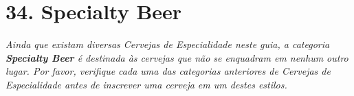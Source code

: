 \section*{34. Specialty Beer}
\textit{Ainda que existam diversas Cervejas de Especialidade neste guia, a categoria \textbf{Specialty Beer} é destinada às cervejas que não se enquadram em nenhum outro lugar. Por favor, verifique cada uma das categorias anteriores de Cervejas de Especialidade antes de inscrever uma cerveja em um destes estilos.}